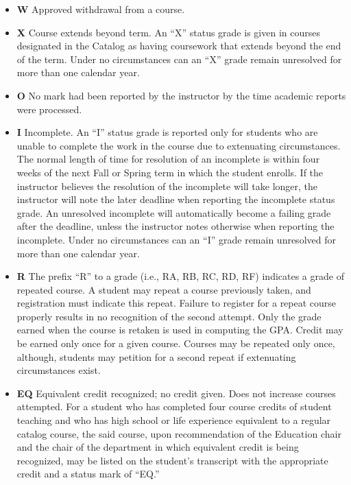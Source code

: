 \documentclass[
  letterpaper,
]{scrbook}
\providecommand{\tightlist}{%
  \setlength{\itemsep}{0pt}\setlength{\parskip}{0pt}}
\begin{document}
\begin{itemize}
\tightlist
\item
  \textbf{W} Approved withdrawal from a course.
\item
  \textbf{X} Course extends beyond term. An ``X'' status grade is given
  in courses designated in the Catalog as having coursework that extends
  beyond the end of the term. Under no circumstances can an ``X'' grade
  remain unresolved for more than one calendar year.
\item
  \textbf{O} No mark had been reported by the instructor by the time
  academic reports were processed.
\item
  \textbf{I} Incomplete. An ``I'' status grade is reported only for
  students who are unable to complete the work in the course due to
  extenuating circumstances. The normal length of time for resolution of
  an incomplete is within four weeks of the next Fall or Spring term in
  which the student enrolls. If the instructor believes the resolution
  of the incomplete will take longer, the instructor will note the later
  deadline when reporting the incomplete status grade. An unresolved
  incomplete will automatically become a failing grade after the
  deadline, unless the instructor notes otherwise when reporting the
  incomplete. Under no circumstances can an ``I'' grade remain
  unresolved for more than one calendar year.
\item
  \textbf{R} The prefix ``R'' to a grade (i.e., RA, RB, RC, RD, RF)
  indicates a grade of repeated course. A student may repeat a course
  previously taken, and registration must indicate this repeat. Failure
  to register for a repeat course properly results in no recognition of
  the second attempt. Only the grade earned when the course is retaken
  is used in computing the GPA. Credit may be earned only once for a
  given course. Courses may be repeated only once, although, students
  may petition for a second repeat if extenuating circumstances exist.
\item
  \textbf{EQ} Equivalent credit recognized; no credit given. Does not
  increase courses attempted. For a student who has completed four
  course credits of student teaching and who has high school or life
  experience equivalent to a regular catalog course, the said course,
  upon recommendation of the Education chair and the chair of the
  department in which equivalent credit is being recognized, may be
  listed on the student's transcript with the appropriate credit and a
  status mark of ``EQ.''
\end{itemize}
\end{document}

